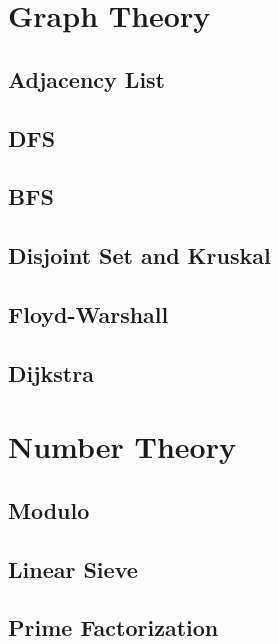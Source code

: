 \section{Graph Theory}
    \subsection{Adjacency List}
            
    \subsection{DFS}
        
    \subsection{BFS}
        
    \subsection{Disjoint Set and Kruskal}
        
    \subsection{Floyd-Warshall}
        
    \subsection{Dijkstra}
        

\section{Number Theory}
    \subsection{Modulo}
        
    \subsection{Linear Sieve}
        
    \subsection{Prime Factorization}
        
